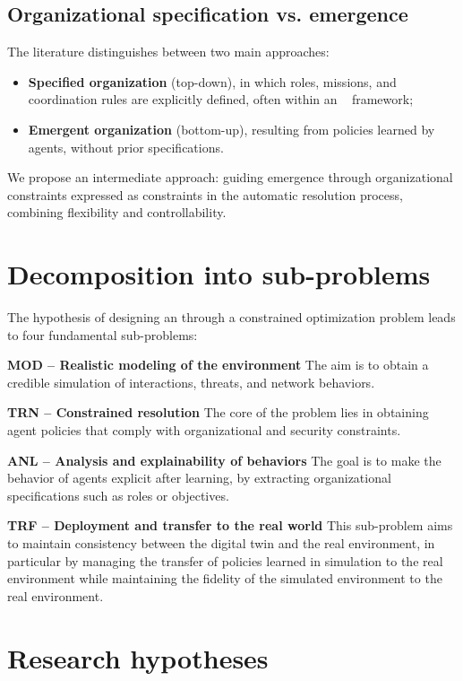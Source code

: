 \subsection{Organizational specification vs. emergence}

The literature distinguishes between two main approaches:
\begin{itemize}
  \item \textbf{Specified organization} (top-down), in which roles, missions, and coordination rules are explicitly defined, often within an ~ framework;
  \item \textbf{Emergent organization} (bottom-up), resulting from policies learned by agents, without prior specifications.
\end{itemize}

We propose an intermediate approach: guiding emergence through organizational constraints expressed as constraints in the automatic resolution process, combining flexibility and controllability.

\section{Decomposition into sub-problems}

The hypothesis of designing an  through a constrained optimization problem leads to four fundamental sub-problems:

\medskip
\noindent
\textbf{\textbf{MOD} -- Realistic modeling of the environment}
The aim is to obtain a credible simulation of interactions, threats, and network behaviors.

\medskip
\noindent
\textbf{\textbf{TRN} -- Constrained resolution}
The core of the problem lies in obtaining agent policies that comply with organizational and security constraints.

\medskip
\noindent
\textbf{\textbf{ANL} -- Analysis and explainability of behaviors}
The goal is to make the behavior of agents explicit after learning, by extracting organizational specifications such as roles or objectives.

\medskip
\noindent
\textbf{\textbf{TRF} -- Deployment and transfer to the real world}
This sub-problem aims to maintain consistency between the digital twin and the real environment, in particular by managing the transfer of policies learned in simulation to the real environment while maintaining the fidelity of the simulated environment to the real environment.

\section{Research hypotheses}

